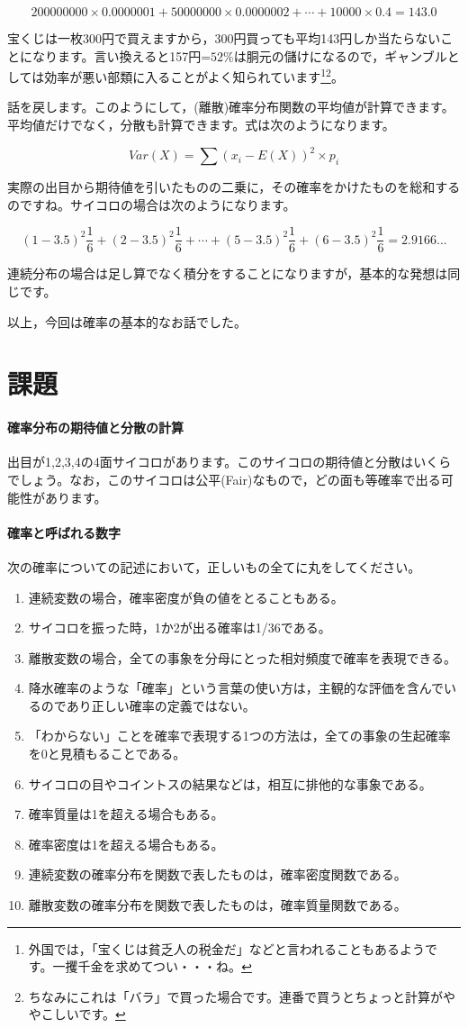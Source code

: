 \documentclass{ltjbook}
\begin{document}
\[200000000 \times 0.0000001 + 50000000 \times 0.0000002 + \cdots + 10000\times0.4=143.0 \]

宝くじは一枚300円で買えますから，300円買っても平均143円しか当たらないことになります。言い換えると157円=$52\%$は胴元の儲けになるので，ギャンブルとしては効率が悪い部類に入ることがよく知られています\footnote{外国では，「宝くじは貧乏人の税金だ」などと言われることもあるようです。一攫千金を求めてつい・・・ね。}\footnote{ちなみにこれは「バラ」で買った場合です。連番で買うとちょっと計算がややこしいです。}。

話を戻します。このようにして，(離散)確率分布関数の平均値が計算できます。平均値だけでなく，分散も計算できます。式は次のようになります。

\[ Var(X) = \sum (x_i-E(X))^2 \times p_i \]

実際の出目から期待値を引いたものの二乗に，その確率をかけたものを総和するのですね。サイコロの場合は次のようになります。

\[
    (1-3.5)^2\frac{1}{6}+
(2-3.5)^2\frac{1}{6}+
\cdots+
(5-3.5)^2\frac{1}{6}+
(6-3.5)^2\frac{1}{6} = 2.9166...
\]

連続分布の場合は足し算でなく積分をすることになりますが，基本的な発想は同じです。

以上，今回は確率の基本的なお話でした。
\section{課題}
\paragraph{確率分布の期待値と分散の計算}出目が1,2,3,4の4面サイコロがあります。このサイコロの期待値と分散はいくらでしょう。なお，このサイコロは公平(Fair)なもので，どの面も等確率で出る可能性があります。 
\paragraph{確率と呼ばれる数字}次の確率についての記述において，正しいもの全てに丸をしてください。

\begin{enumerate}
    \item 連続変数の場合，確率密度が負の値をとることもある。
    \item サイコロを振った時，1か2が出る確率は1/36である。
    \item 離散変数の場合，全ての事象を分母にとった相対頻度で確率を表現できる。
    \item 降水確率のような「確率」という言葉の使い方は，主観的な評価を含んでいるのであり正しい確率の定義ではない。
    \item 「わからない」ことを確率で表現する1つの方法は，全ての事象の生起確率を0と見積もることである。
    \item サイコロの目やコイントスの結果などは，相互に排他的な事象である。
    \item 確率質量は1を超える場合もある。
    \item 確率密度は1を超える場合もある。
    \item 連続変数の確率分布を関数で表したものは，確率密度関数である。
    \item 離散変数の確率分布を関数で表したものは，確率質量関数である。
\end{enumerate}
\end{document}
